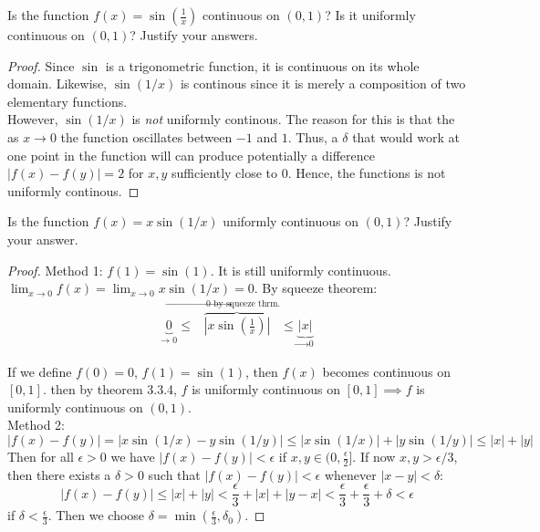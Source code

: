 \documentclass[12pt]{article}
\newenvironment{exercise}[2][Exercise]{\begin{trivlist}
\item[\hskip \labelsep {\bfseries #1}\hskip \labelsep {\bfseries #2.}]}{\end{trivlist}}
\begin{document}
\begin{exercise}{3.3.9}
Is the function $f(x)=\sin(\frac{1}{x})$ continuous on $(0,1)$? Is it uniformly continuous on $(0,1)$? Justify your answers. 
	
	\begin{proof}
	Since $\sin$ is a trigonometric function, it is continuous on its whole domain. Likewise, $\sin(1/x)$ is continous since it is merely a composition of two elementary functions. \\
	However, $\sin(1/x)$ is \emph{not} uniformly continous. The reason for this is that the as $x \to 0$ the function oscillates between $-1$ and $1$. Thus, a $\delta$ that would work at one point in the function will can produce potentially a difference $|f(x)-f(y)|=2$ for $x,y$ sufficiently close to 0. Hence, the functions is not uniformly continous.
	\end{proof}
\end{exercise}


\begin{exercise}{3.3.10}
    Is the function $f(x)=x \sin(1/x)$ uniformly continuous on $(0,1)$? Justify your answer. \\
    
    \begin{proof}
    Method 1: $f(1)=\sin(1)$. It is still uniformly continuous. $\lim_{x \to 0} f(x)= \lim_{x \to 0} x \sin(1/x) = 0$. By squeeze theorem:
		\begin{align*}
		\underbrace{0}_\text{$\to$ 0} \leq \overbrace{|x \sin \left( \frac{1}{x} \right) |}^\text{$\to$ 0 by squeeze thrm.} \leq \underbrace{|x|}_\text{$\to$ 0}
		\end{align*}		       
         
    If we define $f(0)=0$, $f(1)=\sin(1)$, then $f(x)$ becomes continuous on $[0,1]$. then by theorem 3.3.4, $f$ is uniformly continuous on $[0,1] \implies f$ is uniformly continuous on $(0,1)$.\\
    Method 2: 
        \[ |f(x)-f(y)| = |x \sin(1/x) - y \sin(1/y)| \leq |x \sin(1/x)| + |y \sin(1/y)| \leq |x|+|y| \]
    Then for all $\epsilon>0$ we have $|f(x)-f(y)|<\epsilon$ if $x,y \in (0,\frac{\epsilon}{2}]$. If now $x,y > \epsilon/3$, then there exists a $\delta>0$ such that $|f(x)-f(y)| <\epsilon$ whenever $|x-y| < \delta$: 
        \[ |f(x)-f(y)| \leq |x|+|y| < \frac{\epsilon}{3} + |x| + |y-x| < \frac{\epsilon}{3} + \frac{\epsilon}{3}+ \delta < \epsilon \]
    if $\delta< \frac{\epsilon}{3}$. Then we choose $\delta= \min(\frac{\epsilon}{3}, \delta_0)$.
    \end{proof}
\end{exercise}
\end{document}
